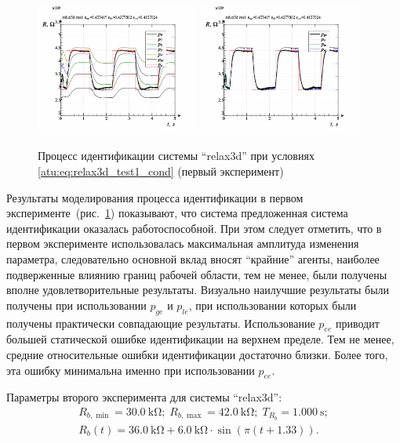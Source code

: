 \begin{figure}[htb!]
  \centerline{
    \includegraphics[width=0.48\textwidth]{p/relax3d_read_id2-p_p_00.png}
    \hfill
    \includegraphics[width=0.48\textwidth]{p/relax3d_read_id2-p_pp_00.png}
  }
  \caption{Процесс идентификации системы ``relax3d'' при условиях \ref{atu:eq:relax3d_test1_cond} (первый эксперимент)}
  \label{atu:f:relax3d_id_1}
\end{figure}

Результаты моделирования процесса идентификации в первом эксперименте~(рис.~\ref{atu:f:relax3d_id_1})
показывают, что система предложенная система идентификации оказалась работоспособной.
При этом следует отметить, что в первом эксперименте использовалась максимальная
амплитуда изменения параметра, следовательно основной вклад вносят ``крайние'' агенты,
наиболее подверженные влиянию границ рабочей области, тем не менее,
были получены вполне удовлетворительные результаты.
Визуально наилучшие результаты были получены при использовании $p_{ge}$ и $p_{le}$,
при использовании которых были получены практически совпадающие результаты.
Использование $p_{ee}$ приводит большей статической ошибке идентификации на верхнем пределе.
Тем не менее, средние относительные ошибки идентификации достаточно близки.
Более того, эта ошибку минимальна именно при использовании $p_{ee}$.



Параметры второго эксперимента для системы ``relax3d'':
%
\begin{equation}
  \begin{array}{c}
    R_{b,\min} = \SI{30.0}{\kilo\ohm};
    \;
    R_{b,\max} = \SI{42.0}{\kilo\ohm};
    \;
    T_{R_b} = \SI{1.000}{\second};
  \\
    R_b(t) = \SI{36.0}{\kilo\ohm} + \SI{6.0}{\kilo\ohm} \cdot \sin( \pi ( t + 1.33 ) ).
  \end{array}
  \label{atu:eq:relax3d_test2_cond}
\end{equation}

